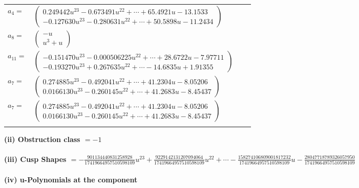 \documentclass[1p]{elsarticle_modified}
\theoremstyle{definition}
\begin{document}
\begin{tabular}{m{7pt} m{180pt} m{7pt} m{180pt} }
\flushright $a_{4}=$&$\begin{pmatrix}0.249442 u^{23}-0.673491 u^{22}+\cdots+65.4921 u-13.1533\\-0.127630 u^{23}-0.280631 u^{22}+\cdots+50.5898 u-11.2434\end{pmatrix}$ \\
\flushright $a_{8}=$&$\begin{pmatrix}- u\\u^3+u\end{pmatrix}$ \\
\flushright $a_{11}=$&$\begin{pmatrix}-0.151470 u^{23}-0.000506225 u^{22}+\cdots+28.6722 u-7.97711\\-0.193270 u^{23}+0.267635 u^{22}+\cdots-14.6835 u+1.91355\end{pmatrix}$ \\
\flushright $a_{7}=$&$\begin{pmatrix}0.274885 u^{23}-0.492041 u^{22}+\cdots+41.2304 u-8.05206\\0.0166130 u^{23}-0.260145 u^{22}+\cdots+41.2683 u-8.45437\end{pmatrix}$\\ \flushright $a_{7}=$&$\begin{pmatrix}0.274885 u^{23}-0.492041 u^{22}+\cdots+41.2304 u-8.05206\\0.0166130 u^{23}-0.260145 u^{22}+\cdots+41.2683 u-8.45437\end{pmatrix}$\\&\end{tabular}
\flushleft \textbf{(ii) Obstruction class $= -1$}\\~\\
\flushleft \textbf{(iii) Cusp Shapes $= -\frac{901134440831258928}{17419664957510598109} u^{23}+\frac{9229142131207094064}{17419664957510598109} u^{22}+\cdots-\frac{158274106809001817232}{17419664957510598109} u-\frac{28047718789326057950}{17419664957510598109}$}\\~\\
\newpage\renewcommand{\arraystretch}{1}
\flushleft \textbf{(iv) u-Polynomials at the component}\newline \\
\end{document}
